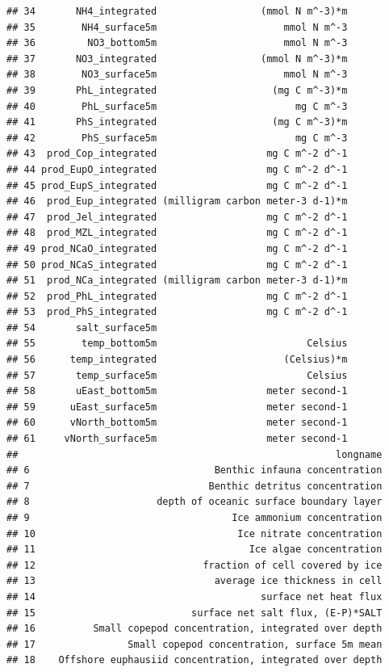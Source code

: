 \documentclass[
]{article}
\begin{document}
\begin{verbatim}
## 34       NH4_integrated                  (mmol N m^-3)*m
## 35        NH4_surface5m                      mmol N m^-3
## 36         NO3_bottom5m                      mmol N m^-3
## 37       NO3_integrated                  (mmol N m^-3)*m
## 38        NO3_surface5m                      mmol N m^-3
## 39       PhL_integrated                    (mg C m^-3)*m
## 40        PhL_surface5m                        mg C m^-3
## 41       PhS_integrated                    (mg C m^-3)*m
## 42        PhS_surface5m                        mg C m^-3
## 43  prod_Cop_integrated                   mg C m^-2 d^-1
## 44 prod_EupO_integrated                   mg C m^-2 d^-1
## 45 prod_EupS_integrated                   mg C m^-2 d^-1
## 46  prod_Eup_integrated (milligram carbon meter-3 d-1)*m
## 47  prod_Jel_integrated                   mg C m^-2 d^-1
## 48  prod_MZL_integrated                   mg C m^-2 d^-1
## 49 prod_NCaO_integrated                   mg C m^-2 d^-1
## 50 prod_NCaS_integrated                   mg C m^-2 d^-1
## 51  prod_NCa_integrated (milligram carbon meter-3 d-1)*m
## 52  prod_PhL_integrated                   mg C m^-2 d^-1
## 53  prod_PhS_integrated                   mg C m^-2 d^-1
## 54       salt_surface5m                                 
## 55        temp_bottom5m                          Celsius
## 56      temp_integrated                      (Celsius)*m
## 57       temp_surface5m                          Celsius
## 58       uEast_bottom5m                   meter second-1
## 59      uEast_surface5m                   meter second-1
## 60      vNorth_bottom5m                   meter second-1
## 61     vNorth_surface5m                   meter second-1
##                                                       longname
## 6                                Benthic infauna concentration
## 7                               Benthic detritus concentration
## 8                      depth of oceanic surface boundary layer
## 9                                   Ice ammonium concentration
## 10                                   Ice nitrate concentration
## 11                                     Ice algae concentration
## 12                             fraction of cell covered by ice
## 13                               average ice thickness in cell
## 14                                       surface net heat flux
## 15                           surface net salt flux, (E-P)*SALT
## 16          Small copepod concentration, integrated over depth
## 17                Small copepod concentration, surface 5m mean
## 18    Offshore euphausiid concentration, integrated over depth

\end{verbatim}
\end{document}
